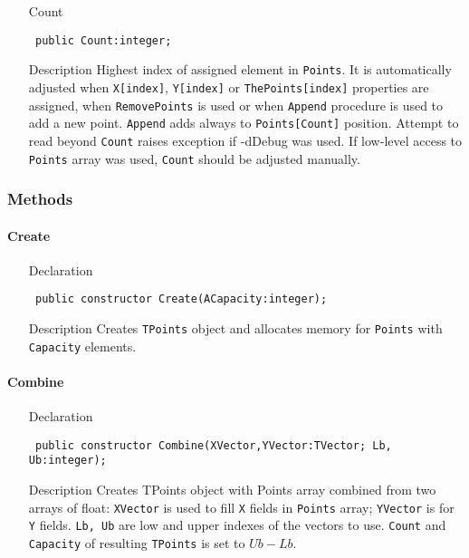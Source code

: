 \documentclass[12pt,a4paper,oneside]{report}
\newcommand{\declarationitem}[1]{{\addfontfeatures{FakeSlant} #1}}
\newcommand{\descriptiontitle}[1]{{\addfontfeatures{FakeSlant}#1}}
\newcommand{\inlineitem}[1]{{\addfontfeatures{FakeBold} #1}}
\newcommand{\code}[1]{\texttt{#1}}
\begin{document}
\begin{itemize}
\item[\inlineitem{Count}\hfill]
\begin{flushleft}
	\code{
		public Count:integer;}
\end{flushleft}
\item[\descriptiontitle{Description}]	
Highest index of assigned element in \code{Points}. It is automatically adjusted when \code{X[index]}, \code{Y[index]} or \code{ThePoints[index]} properties are assigned, when \code{RemovePoints} is used or when \code{Append} procedure is used to add a new point. \code{Append} adds always to \code{Points[Count]} position. Attempt to read beyond \code{Count} raises exception if -dDebug was used. If low-level access to \code{Points} array was used, \code{Count} should be adjusted manually.
\par  \end{itemize}

\subsubsection{Methods}
\paragraph{Create}\hspace*{\fill}
\label{lmPointsVec.TPoints-Create}
\begin{itemize}\item[\declarationitem{Declaration}\hfill]
	\begin{flushleft}
		\code{
			public constructor Create(ACapacity:integer);}
	\end{flushleft}
	\item[\descriptiontitle{Description}]
	Creates \code{TPoints} object and allocates memory for \code{Points} with \code{Capacity} elements. 
\end{itemize}
\paragraph{Combine}\hspace*{\fill}
\label{lmPointsVec.TPoints-Combine}
\begin{itemize}\item[\declarationitem{Declaration}\hfill]
	\begin{flushleft}
		\code{
			public constructor Combine(XVector,YVector:TVector; Lb, Ub:integer);}
	\end{flushleft}
	\item[\descriptiontitle{Description}]
	Creates TPoints object with Points array combined from two arrays of float: \code{XVector} is used to fill \code{X} fields in \code{Points} array; \code{YVector} is for \code{Y} fields. \code{Lb, Ub} are low and upper indexes of the vectors to use. \code{Count} and \code{Capacity} of resulting \code{TPoints} is set to $Ub-Lb$. 
\end{itemize}
\end{document}
